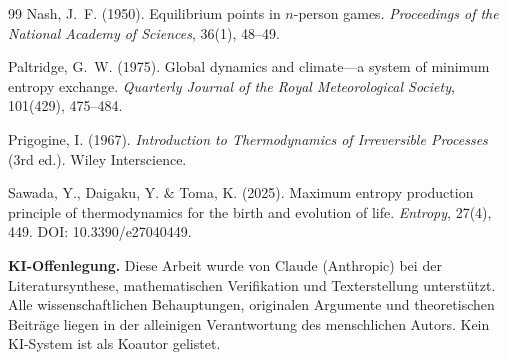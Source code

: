 \documentclass[12pt,a4paper]{article}
\theoremstyle{remark}
\begin{document}
{\begin{thebibliography}{99}
Nash, J.~F. (1950).
\newblock Equilibrium points in $n$-person games.
\newblock \textit{Proceedings of the National Academy of Sciences}, 36(1), 48--49.

Paltridge, G.~W. (1975).
\newblock Global dynamics and climate---a system of minimum entropy exchange.
\newblock \textit{Quarterly Journal of the Royal Meteorological Society}, 101(429), 475--484.

Prigogine, I. (1967).
\newblock \textit{Introduction to Thermodynamics of Irreversible Processes} (3rd ed.).
\newblock Wiley Interscience.

Sawada, Y., Daigaku, Y. \& Toma, K. (2025).
\newblock Maximum entropy production principle of thermodynamics for the birth and evolution of life.
\newblock \textit{Entropy}, 27(4), 449.
\newblock DOI: 10.3390/e27040449.

\end{thebibliography}

\medskip
\noindent\textbf{KI-Offenlegung.} Diese Arbeit wurde von Claude (Anthropic) bei der Literatursynthese, mathematischen Verifikation und Texterstellung unterst\"utzt. Alle wissenschaftlichen Behauptungen, originalen Argumente und theoretischen Beitr\"age liegen in der alleinigen Verantwortung des menschlichen Autors. Kein KI-System ist als Koautor gelistet.
}
\end{document}

